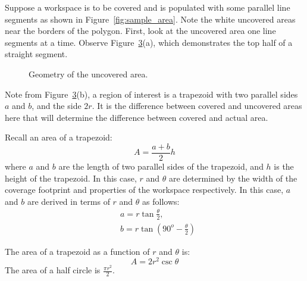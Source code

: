 \documentclass[../main.tex]{subfiles}
\begin{document}
Suppose a workspace is to be covered and is populated with some parallel line segments as shown in Figure~\ref{fig:sample_area}. Note the white uncovered areas near the borders of the polygon. First, look at the uncovered area one line segments at a time. Observe Figure~\ref{fig:area_error}(a), which demonstrates the top half of a straight segment.

%

\begin{figure}
	\centering
	\begin{subfigure}{0.5\linewidth}
		\centering
		\caption{\label{fig:area_error_i}}
	\end{subfigure}%
	\begin{subfigure}{0.5\linewidth}
		\centering
		
		\caption{\label{fig:area_error_ii}}
	\end{subfigure}
	\caption{Geometry of the uncovered area.}
	\label{fig:area_error}
\end{figure}

Note from Figure~\ref{fig:area_error}(b), a region of interest is a trapezoid with two parallel sides $a$ and $b$, and the side $2r$. It is the difference between covered and uncovered areas here that will determine the difference between covered and actual area.

Recall an area of a trapezoid:
\begin{equation}
	A=\frac{a+b}{2}h
\end{equation}
where $a$ and $b$ are the length of two parallel sides of the trapezoid, and $h$ is the height of the trapezoid. In this case, $r$ and $\theta$ are determined by the width of the coverage footprint and properties of the workspace respectively. In this case, $a$ and $b$ are derived in terms of $r$ and $\theta$ as follows:
\begin{equation}
	\begin{aligned}
		&a=r\tan{\frac{\theta}{2}},\\
		&b=r\tan\left(90^o-\frac{\theta}{2}\right)
	\end{aligned}
\end{equation}

The area of a trapezoid as a function of $r$ and $\theta$ is:
\begin{equation}
	A=2r^2\csc{\theta}
\end{equation}
The area of a half circle is $\frac{\pi r^2}{2}$.
\end{document}
